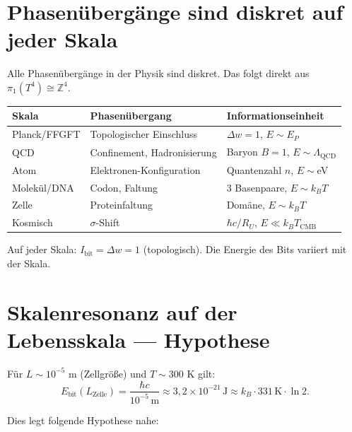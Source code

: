 \section{Phasenübergänge sind diskret auf jeder Skala}

Alle Phasenübergänge in der Physik sind diskret.
Das folgt direkt aus \(\pi_1(T^4) \cong \mathbb{Z}^4\).

\begin{center}
\renewcommand{\arraystretch}{1.4}
\begin{tabular}{lll}
\toprule
\textbf{Skala} & \textbf{Phasenübergang} & \textbf{Informationseinheit} \\
\midrule
Planck/FFGFT & Topologischer Einschluss & \(\Delta w=1\), \(E \sim E_P\) \\
QCD          & Confinement, Hadronisierung & Baryon \(B=1\), \(E\sim\Lambda_\text{QCD}\) \\
Atom         & Elektronen-Konfiguration & Quantenzahl \(n\), \(E\sim\)eV \\
Molekül/DNA  & Codon, Faltung & 3 Basenpaare, \(E\sim k_BT\) \\
Zelle        & Proteinfaltung & Domäne, \(E\sim k_BT\) \\
Kosmisch     & \(\sigma\)-Shift & \(\hbar c / R_U\), \(E\ll k_BT_\text{CMB}\) \\
\bottomrule
\end{tabular}
\end{center}

Auf jeder Skala: \(I_\text{bit} = \Delta w = 1\) (topologisch).
Die Energie des Bits variiert mit der Skala.

\section{Skalenresonanz auf der Lebensskala — Hypothese}

Für \(L \sim 10^{-5}\) m (Zellgröße) und \(T \sim 300\) K gilt:
\begin{equation}
  E_\text{bit}(L_\text{Zelle}) = \frac{\hbar c}{10^{-5}\,\text{m}}
  \approx 3{,}2 \times 10^{-21}\,\text{J}
  \approx k_B \cdot 331\,\text{K} \cdot \ln 2.
\end{equation}

Dies legt folgende Hypothese nahe:

